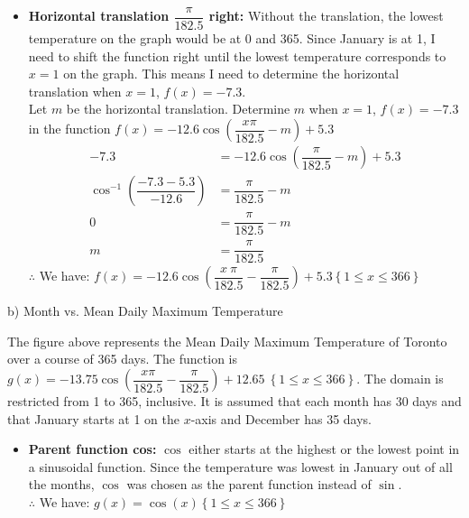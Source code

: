 \documentclass[12pt]{book}
\begin{document}
\begin{enumerate}
\begin{itemize}
  \item \textbf{Horizontal translation $\dfrac{\pi}{182.5}$ right:} Without the translation, the lowest temperature on the graph would be at 0 and 365. Since January is at 1, I need to shift the function right until the lowest temperature corresponds to $x = 1$ on the graph. This means I need to determine the horizontal translation when $x = 1$, $f(x) = -7.3$.\\
  Let $m$ be the horizontal translation. Determine $m$ when $x = 1$, $f(x) = -7.3$ in the function $f\left(x\right)=-12.6\cos\left(\dfrac{x\pi}{182.5} - m\right)+5.3$
  \begin{align*}
      -7.3 &= -12.6\cos\left(\dfrac{\pi}{182.5} - m\right) + 5.3\\
      \cos^{-1}\left(\dfrac{-7.3 - 5.3}{-12.6}\right) &= \dfrac{\pi}{182.5} - m\\
      0 &= \dfrac{\pi}{182.5} - m\\
      m &= \dfrac{\pi}{182.5}
  \end{align*}
  $\therefore$ We have: $f\left(x\right)=-12.6\cos\left(\dfrac{x\ \pi}{182.5}-\dfrac{\pi}{182.5}\right)+5.3\left\{1\le x\le366\right\}$
\end{itemize} %
b) Month vs. Mean Daily Maximum Temperature \\
\begin{figure}[H]
\end{figure}
The figure above represents the Mean Daily Maximum Temperature of Toronto over a course of 365 days. The function is $g\left(x\right)=-13.75\cos\left(\dfrac{x\pi}{182.5}-\dfrac{\pi}{182.5}\right)+12.65\ \left\{1\le x\le366\right\}$. The domain is restricted from 1 to 365, inclusive. It is assumed that each month has 30 days and that January starts at 1 on the $x$-axis and December has 35 days.
\begin{itemize} %
  \item \textbf{Parent function cos:} $\cos$ either starts at the highest or the lowest point in a sinusoidal function. Since the temperature was lowest in January out of all the months, $\cos$ was chosen as the parent function instead of $\sin$.\\
  $\therefore$ We have: $g(x) = \cos(x) \left\{1\le x\le366\right\}$
  

\end{itemize}
\end{enumerate}
\end{document}
